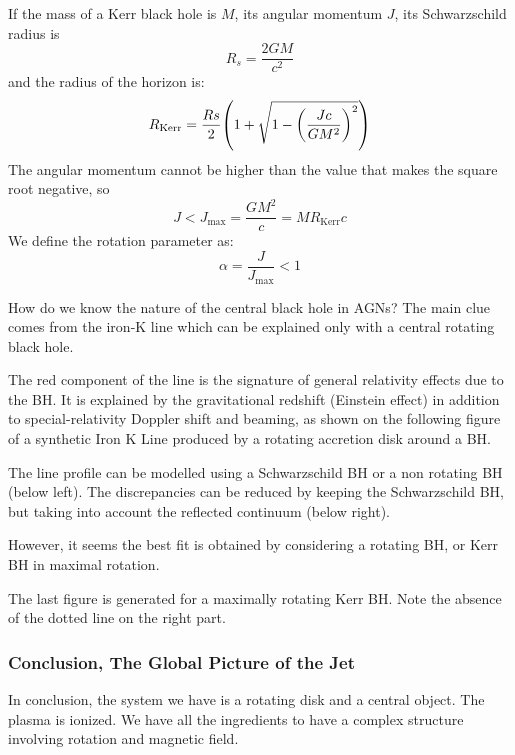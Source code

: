 \documentclass[10pt,a4paper,english,draft]{article}
\let\originalleft\left
\let\originalright\right
\renewcommand{\left}{\mathopen{}\mathclose\bgroup\originalleft}
\renewcommand{\right}{\aftergroup\egroup\originalright}
\begin{document}
If the mass of a Kerr black hole is $M$, its angular momentum $J$, its Schwarzschild radius is
\begin{equation}
  R_s = \frac{2GM}{c^2}
\end{equation}
and the radius of the horizon is:
\begin{equation}
  R_\mathrm{Kerr} = \frac{Rs}{2} \left( 1 + \sqrt{1-\left( \frac{Jc}{GM^2} \right)^2 } \right)
\end{equation}
The angular momentum cannot be higher than the value that makes the square root negative, so
\begin{equation}
  J < J_\mathrm{max} = \frac{GM^2}{c} = MR_\mathrm{Kerr}c
\end{equation}
We define the rotation parameter as:
\begin{equation}
  \alpha = \frac{J}{J_\mathrm{max}} < 1
\end{equation}

How do we know the nature of the central black hole in AGNs? The main clue comes from the iron-K line which can be explained only with a central rotating black hole.


The red component of the line is the signature of general relativity effects due to the BH. It is explained by the gravitational redshift (Einstein effect) in addition to special-relativity Doppler shift and beaming, as shown on the following figure of a synthetic Iron K Line produced by a rotating accretion disk around a BH.


The line profile can be modelled using a Schwarzschild BH or a non rotating BH (below left). The discrepancies can be reduced by keeping the Schwarzschild BH, but taking into account the reflected continuum (below right).


However, it seems the best fit is obtained by considering a rotating BH, or Kerr BH in maximal rotation.

The last figure is generated for a maximally rotating Kerr BH. Note the absence of the dotted line on the right part.
\subsubsection{Conclusion, The Global Picture of the Jet}

In conclusion, the system we have is a rotating disk and a central
object. The plasma is ionized. We have all the ingredients to have a complex
structure involving rotation and magnetic field.
\end{document}
